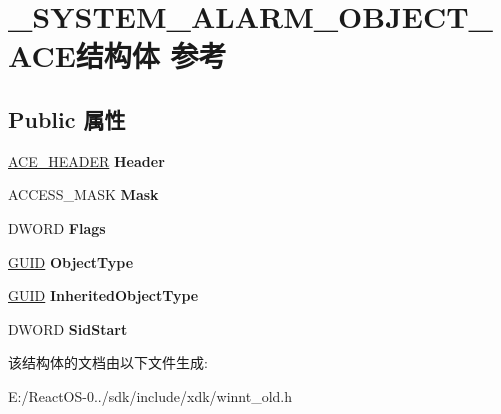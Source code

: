 \hypertarget{struct___s_y_s_t_e_m___a_l_a_r_m___o_b_j_e_c_t___a_c_e}{}\section{\+\_\+\+S\+Y\+S\+T\+E\+M\+\_\+\+A\+L\+A\+R\+M\+\_\+\+O\+B\+J\+E\+C\+T\+\_\+\+A\+C\+E结构体 参考}
\label{struct___s_y_s_t_e_m___a_l_a_r_m___o_b_j_e_c_t___a_c_e}
\subsection*{Public 属性}
\begin{DoxyCompactItemize}
\item 
\mbox{\label{struct___s_y_s_t_e_m___a_l_a_r_m___o_b_j_e_c_t___a_c_e_ac8b7e0924f8ea10e5f32c70fd259ef13}} 
\hyperlink{struct___a_c_e___h_e_a_d_e_r}{A\+C\+E\+\_\+\+H\+E\+A\+D\+ER} {\bfseries Header}
\item 
\mbox{\label{struct___s_y_s_t_e_m___a_l_a_r_m___o_b_j_e_c_t___a_c_e_aa57269ff2a7135f36dd7b04b758e7421}} 
A\+C\+C\+E\+S\+S\+\_\+\+M\+A\+SK {\bfseries Mask}
\item 
\mbox{\label{struct___s_y_s_t_e_m___a_l_a_r_m___o_b_j_e_c_t___a_c_e_a224e83bb0aad4c9fe85245a8931157a0}} 
D\+W\+O\+RD {\bfseries Flags}
\item 
\mbox{\label{struct___s_y_s_t_e_m___a_l_a_r_m___o_b_j_e_c_t___a_c_e_a220ed50f40ea6ef5b83e2fb339a0d683}} 
\hyperlink{interface_g_u_i_d}{G\+U\+ID} {\bfseries Object\+Type}
\item 
\mbox{\label{struct___s_y_s_t_e_m___a_l_a_r_m___o_b_j_e_c_t___a_c_e_a94c82b7facef10a3537b372d8223f55c}} 
\hyperlink{interface_g_u_i_d}{G\+U\+ID} {\bfseries Inherited\+Object\+Type}
\item 
\mbox{\label{struct___s_y_s_t_e_m___a_l_a_r_m___o_b_j_e_c_t___a_c_e_af0665056822594224b25f0ac7a457f87}} 
D\+W\+O\+RD {\bfseries Sid\+Start}
\end{DoxyCompactItemize}


该结构体的文档由以下文件生成\+:\begin{DoxyCompactItemize}
\item 
E\+:/\+React\+O\+S-\/0../sdk/include/xdk/winnt\+\_\+old.\+h\end{DoxyCompactItemize}
